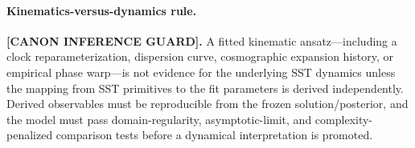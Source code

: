 \paragraph{Kinematics-versus-dynamics rule.}
\textbf{[CANON INFERENCE GUARD].}
A fitted kinematic ansatz---including a clock reparameterization, dispersion
curve, cosmographic expansion history, or empirical phase warp---is not
evidence for the underlying SST dynamics unless the mapping from SST
primitives to the fit parameters is derived independently.  Derived
observables must be reproducible from the frozen solution/posterior, and the
model must pass domain-regularity, asymptotic-limit, and complexity-penalized
comparison tests before a dynamical interpretation is promoted.
